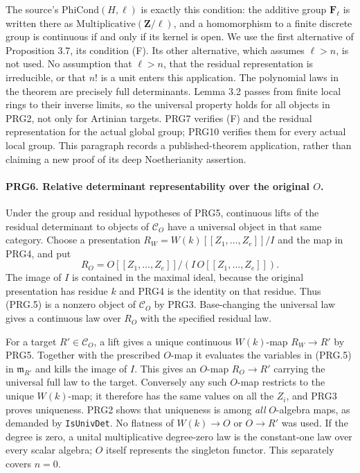 The source's \(\mathrm{PhiCond}(H,\ell)\) is exactly this condition:
the additive group \(\mathbf F_\ell\) is written there as
\(\mathrm{Multiplicative}(\mathbf Z/\ell)\), and a homomorphism to
a finite discrete group is continuous if and only if its kernel is
open. We use the first alternative of Proposition 3.7, its
condition (F). Its other alternative, which assumes \(\ell>n\),
is not used. No assumption that \(\ell>n\), that the residual
representation is irreducible, or that \(n!\) is a unit enters this
application. The polynomial laws in the theorem are precisely full
determinants. Lemma 3.2 passes from finite local rings to their
inverse limits, so the universal property holds for all objects
in PRG2, not only for Artinian targets. PRG7 verifies (F) and the
residual representation for the actual global group; PRG10 verifies
them for every actual local group. This paragraph records a
published-theorem application, rather than claiming a new proof
of its deep Noetherianity assertion.

\paragraph{PRG6. Relative determinant representability over the original \(O\).}
\label{claim:PRG6}
Under the group and residual hypotheses of PRG5, continuous lifts of
the residual determinant to objects of \(\mathcal C_O\) have a
universal object in that same category. Choose a presentation
\(R_W=W(k)[[Z_1,\ldots,Z_e]]/I\) and the map in PRG4, and put
\[
 R_O=O[[Z_1,\ldots,Z_e]]/(I\,O[[Z_1,\ldots,Z_e]]).            \tag{PRG.5}
\]
The image of \(I\) is contained in the maximal ideal, because the
original presentation has residue \(k\) and PRG4 is the identity
on that residue. Thus (PRG.5) is a nonzero object of
\(\mathcal C_O\) by PRG3. Base-changing the universal law gives
a continuous law over \(R_O\) with the specified residual law.

For a target \(R'\in\mathcal C_O\), a lift gives a unique
continuous \(W(k)\)-map \(R_W\to R'\) by PRG5. Together with
the prescribed \(O\)-map it evaluates the variables in (PRG.5)
in \(\mathfrak m_{R'}\) and kills the image of \(I\). This gives
an \(O\)-map \(R_O\to R'\) carrying the universal full law to
the target. Conversely any such \(O\)-map restricts to the unique
\(W(k)\)-map; it therefore has the same values on all the \(Z_i\),
and PRG3 proves uniqueness. PRG2 shows that uniqueness is among
\emph{all} \(O\)-algebra maps, as demanded by \texttt{IsUnivDet}.
No flatness of \(W(k)\to O\) or \(O\to R'\) was used. If the
degree is zero, a unital multiplicative degree-zero law is the
constant-one law over every scalar algebra; \(O\) itself represents
the singleton functor. This separately covers \(n=0\).

